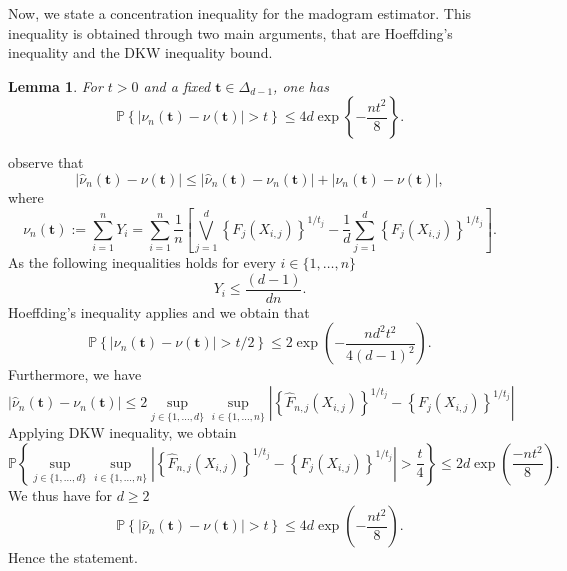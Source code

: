 \documentclass[11pt]{article}
\makeatletter
\newtheorem{lemma}{Lemma}
\renewenvironment{proof}[1][\proofname]{\par
\pushQED{\qed}%
\normalfont \topsep6\p@\@plus6\p@\relax
\trivlist
\item\relax
{\textbf{
#1\@addpunct{ }}}\hspace\labelsep\ignorespaces
}{%
\popQED\endtrivlist\@endpefalse
}
\makeatother
\begin{document}
	Now, we state a concentration inequality for the madogram estimator. This inequality is obtained through two main arguments, that are Hoeffding's inequality and the DKW inequality bound.
	
	\begin{lemma}
		\label{lem:mado_concent}
		For $t > 0$ and a fixed $\textbf{t} \in \Delta_{d-1}$, one has
		\begin{equation*}
			\mathbb{P}\left\{ |\nu_n(\textbf{t}) - \nu(\textbf{t}) | > t \right\} \leq 4 d \exp \left\{ -\frac{n t^2}{8} \right\}.
		\end{equation*}
	\end{lemma}
	\begin{proof}
		observe that
		\begin{equation*}
			|\hat{\nu}_n(\textbf{t}) - \nu(\textbf{t})| \leq |\hat{\nu}_n(\textbf{t}) - \nu_n(\textbf{t}) | + |\nu_n(\textbf{t}) - \nu(\textbf{t}) |,
		\end{equation*}
		where
		\begin{equation*}
			\nu_n(\textbf{t}) := \sum_{i=1}^n Y_i = \sum_{i=1}^n \frac{1}{n} \left[ \bigvee_{j=1}^d \left\{ F_j(X_{i,j}) \right\}^{1/t_j} - \frac{1}{d} \sum_{j=1}^d \left\{ F_j(X_{i,j}) \right\}^{1/t_j} \right].
		\end{equation*}
		As the following inequalities holds for every $i \in \{1,\dots,n\}$
		\begin{equation*}
			Y_i \leq \frac{(d-1)}{dn}.
		\end{equation*}
		Hoeffding's inequality applies and we obtain that
		\begin{equation*}
			\mathbb{P}\left\{ |\nu_n(\textbf{t}) - \nu(\textbf{t}) | > t / 2 \right\} \leq 2 \exp\left( - \frac{n d^2 t^2}{4(d-1)^2} \right).
		\end{equation*}
		Furthermore, we have 
		\begin{equation*}
			|\hat{\nu}_n(\textbf{t}) - \nu_n(\textbf{t}) | \leq 2 \underset{j \in \{1,\dots,d\}}{\sup}\underset{i \in \{1,\dots,n\}}{\sup} \left|\left\{ \hat{F}_{n,j}(X_{i,j}) \right\}^{1/t_j}- \left\{ F_{j}(X_{i,j}) \right\}^{1/t_j} \right|
		\end{equation*}
		Applying DKW inequality, we obtain
		\begin{equation*}
			\mathbb{P}\left\{ \underset{j \in \{1,\dots,d\}}{\sup}\underset{i \in \{1,\dots,n\}}{\sup} \left|\left\{ \hat{F}_{n,j}(X_{i,j}) \right\}^{1/t_j}- \left\{ F_{j}(X_{i,j}) \right\}^{1/t_j} \right|> \frac{t}{4}\right\} \leq 2d \exp\left( \frac{-nt^2}{8} \right).
		\end{equation*}
		We thus have for $d \geq 2$
		\begin{equation*}
			\mathbb{P}\left\{ \left| \hat{\nu}_n(\textbf{t}) - \nu(\textbf{t}) \right| > t \right\} \leq 4d\exp\left(- \frac{n t^2}{8} \right).
		\end{equation*}
		Hence the statement.
	\end{proof}
	
\end{document}
